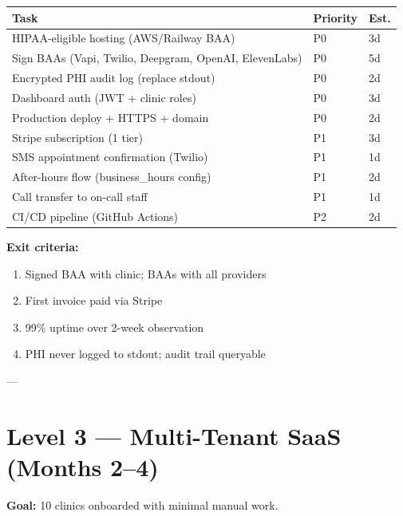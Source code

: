 \documentclass[11pt,a4paper]{article}
\begin{document}
\begin{center}
\small
\begin{tabular}{@{}lll@{}}
\toprule
\textbf{Task} & \textbf{Priority} & \textbf{Est.} \\
\midrule
HIPAA-eligible hosting (AWS/Railway BAA) & P0 & 3d \\
Sign BAAs (Vapi, Twilio, Deepgram, OpenAI, ElevenLabs) & P0 & 5d \\
Encrypted PHI audit log (replace stdout) & P0 & 2d \\
Dashboard auth (JWT + clinic roles) & P0 & 3d \\
Production deploy + HTTPS + domain & P0 & 2d \\
Stripe subscription (1 tier) & P1 & 3d \\
SMS appointment confirmation (Twilio) & P1 & 1d \\
After-hours flow (business\_hours config) & P1 & 2d \\
Call transfer to on-call staff & P1 & 1d \\
CI/CD pipeline (GitHub Actions) & P2 & 2d \\
\bottomrule
\end{tabular}
\end{center}

\textbf{Exit criteria:}
\begin{enumerate}[nosep]
  \item Signed BAA with clinic; BAAs with all providers
  \item First invoice paid via Stripe
  \item 99\% uptime over 2-week observation
  \item PHI never logged to stdout; audit trail queryable
\end{enumerate}

---

\section{Level 3 --- Multi-Tenant SaaS (Months 2--4)}

\textbf{Goal:} 10 clinics onboarded with minimal manual work.
\end{document}
